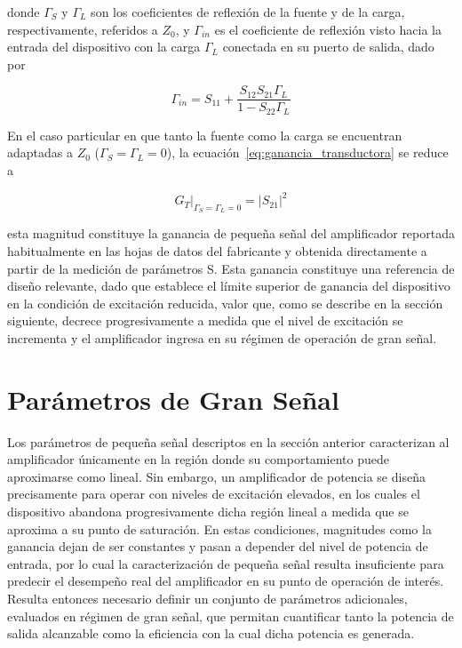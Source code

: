 donde $\Gamma_S$ y $\Gamma_L$ son los coeficientes de reflexión de la fuente y de la carga, respectivamente, referidos a $Z_0$, y $\Gamma_{in}$ es el coeficiente de reflexión visto hacia la entrada del dispositivo con la carga $\Gamma_L$ conectada en su puerto de salida, dado por \cite[p.~560]{pozar2011}

\begin{equation}
    \Gamma_{in} = S_{11} + \frac{S_{12}S_{21}\Gamma_L}{1-S_{22}\Gamma_L}
    \label{eq:gamma_in}
\end{equation}

En el caso particular en que tanto la fuente como la carga se encuentran adaptadas a $Z_0$ ($\Gamma_S = \Gamma_L = 0$), la ecuación~\eqref{eq:ganancia_transductora} se reduce a

\begin{equation}
    G_T\big|_{\Gamma_S=\Gamma_L=0} = |S_{21}|^2
    \label{eq:ganancia_s21}
\end{equation}

esta magnitud constituye la ganancia de pequeña señal del amplificador reportada habitualmente en las hojas de datos del fabricante y obtenida directamente a partir de la medición de parámetros S. Esta ganancia constituye una referencia de diseño relevante, dado que establece el límite superior de ganancia del dispositivo en la condición de excitación reducida, valor que, como se describe en la sección siguiente, decrece progresivamente a medida que el nivel de excitación se incrementa y el amplificador ingresa en su régimen de operación de gran señal.

\section{Parámetros de Gran Señal}
Los parámetros de pequeña señal descriptos en la sección anterior caracterizan al amplificador únicamente en la región donde su comportamiento puede aproximarse como lineal. Sin embargo, un amplificador de potencia se diseña precisamente para operar con niveles de excitación elevados, en los cuales el dispositivo abandona progresivamente dicha región lineal a medida que se aproxima a su punto de saturación. En estas condiciones, magnitudes como la ganancia dejan de ser constantes y pasan a depender del nivel de potencia de entrada, por lo cual la caracterización de pequeña señal resulta insuficiente para predecir el desempeño real del amplificador en su punto de operación de interés. Resulta entonces necesario definir un conjunto de parámetros adicionales, evaluados en régimen de gran señal, que permitan cuantificar tanto la potencia de salida alcanzable como la eficiencia con la cual dicha potencia es generada.

